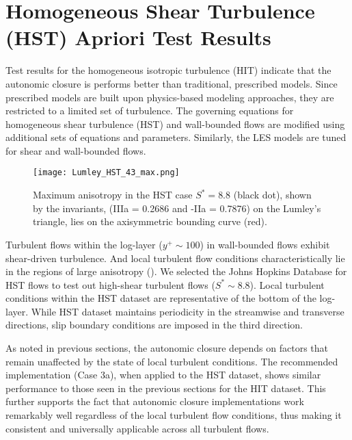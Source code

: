 \section{Homogeneous Shear Turbulence (HST) Apriori Test Results}
\label{sec:IVHST}

Test results for the homogeneous isotropic turbulence (HIT) indicate that the autonomic closure is performs better than traditional, prescribed models.  Since prescribed models are built upon physics-based modeling approaches, they are restricted to a limited set of turbulence. The governing equations for homogeneous shear turbulence (HST) and wall-bounded flows are modified using additional sets of equations and parameters. Similarly, the LES models are tuned for shear and wall-bounded flows. 

%
\begin{figure}
	\begin{center} 
	\texttt{[image: Lumley\_HST\_43\_max.png]}
	\caption{Maximum anisotropy in the HST case $S^* = 8.8$ (black dot), shown by the invariants, (IIIa = 0.2686 and -IIa = 0.7876) on the Lumley’s triangle, lies on the axisymmetric bounding curve (red).}
	\label{F:Lumley}
	\end{center}
\end{figure}
%
%

Turbulent flows within the log-layer ($y^+\sim100$) in wall-bounded flows exhibit shear-driven turbulence. And local turbulent flow conditions characteristically lie in the regions of large anisotropy (). We selected the Johns Hopkins Database for HST flows to test out high-shear turbulent flows ($S^*\sim8.8$). Local turbulent conditions within the HST dataset \cite{jhu256} are representative of the bottom of the log-layer. While HST dataset maintains periodicity in the streamwise and transverse directions, slip boundary conditions are imposed in the third direction.

As noted in previous sections, the autonomic closure depends on factors that remain unaffected by the state of local turbulent conditions. The recommended implementation (Case 3a), when applied to the HST dataset, shows similar performance to those seen in the previous sections for the HIT dataset. This further supports the fact that autonomic closure implementations work remarkably well regardless of the local turbulent flow conditions, thus making it consistent and universally applicable across all turbulent flows.


